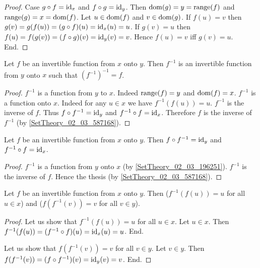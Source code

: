 \documentclass[../../set-theory.tex]{subfiles}
\begin{document}
\begin{forthel}
\begin{proof}
      Case $g \circ f = \operatorname{id}_{x}$ and $f \circ g = \operatorname{id}_{y}$.
        Then $\operatorname{dom}(g) = y = \operatorname{range}(f)$ and $\operatorname{range}(g) = x = \operatorname{dom}(f)$.
        Let $u \in \operatorname{dom}(f)$ and $v \in \operatorname{dom}(g)$.
        If $f(u) = v$ then $g(v) = g(f(u)) = (g \circ f)(u) = \operatorname{id}_{x}(u) = u$.
        If $g(v) = u$ then $f(u) = f(g(v)) = (f \circ g)(v) = \operatorname{id}_{y}(v) = v$.
        Hence $f(u) = v$ iff $g(v) = u$.
      End.
    \end{proof}

    \begin{proposition}\label{SetTheory_02_03_196251}
      Let $f$ be an invertible function from $x$ onto $y$.
      Then $f^{-1}$ is an invertible function from $y$ onto $x$ such that $(f^{-1})^{-1} = f$.
    \end{proposition}
    \begin{proof}
      $f^{-1}$ is a function from $y$ to $x$.
      Indeed $\operatorname{range}(f) = y$ and $\operatorname{dom}(f) = x$.
      $f^{-1}$ is a function onto $x$.
      Indeed for any $u \in x$ we have $f^{-1}(f(u)) = u$.
      $f^{-1}$ is the inverse of $f$.
      Thus $f \circ f^{-1} = \operatorname{id}_{y}$ and $f^{-1} \circ f = \operatorname{id}_{x}$.
      Therefore $f$ is the inverse of $f^{-1}$ (by \ref{SetTheory_02_03_587168}).
    \end{proof}

    \begin{proposition}\label{SetTheory_02_03_601485}
      Let $f$ be an invertible function from $x$ onto $y$.
      Then $f \circ f^{-1} = \operatorname{id}_{y}$ and $f^{-1} \circ f = \operatorname{id}_{x}$.
    \end{proposition}
    \begin{proof}
      $f^{-1}$ is a function from $y$ onto $x$ (by \ref{SetTheory_02_03_196251}).
      $f^{-1}$ is the inverse of $f$.
      Hence the thesis (by \ref{SetTheory_02_03_587168}).
    \end{proof}

    \begin{proposition}\label{SetTheory_02_03_173329}
      Let $f$ be an invertible function from $x$ onto $y$.
      Then ($f^{-1}(f(u)) = u$ for all $u \in x$) and ($f(f^{-1}(v)) = v$ for all $v \in y$).
    \end{proposition}
    \begin{proof}
      Let us show that  $f^{-1}(f(u)) = u$ for all $u \in x$.
        Let $u \in x$.
        Then $f^{-1}(f(u)) = (f^{-1} \circ f)(u) = \operatorname{id}_{x}(u) = u$.
      End.

      Let us show that $f(f^{-1}(v)) = v$ for all $v \in y$.
        Let $v \in y$.
        Then $f(f^{-1}(v)) = (f \circ f^{-1})(v) = \operatorname{id}_{y}(v) = v$.
      End.
    \end{proof}


\end{forthel}
\end{document}
